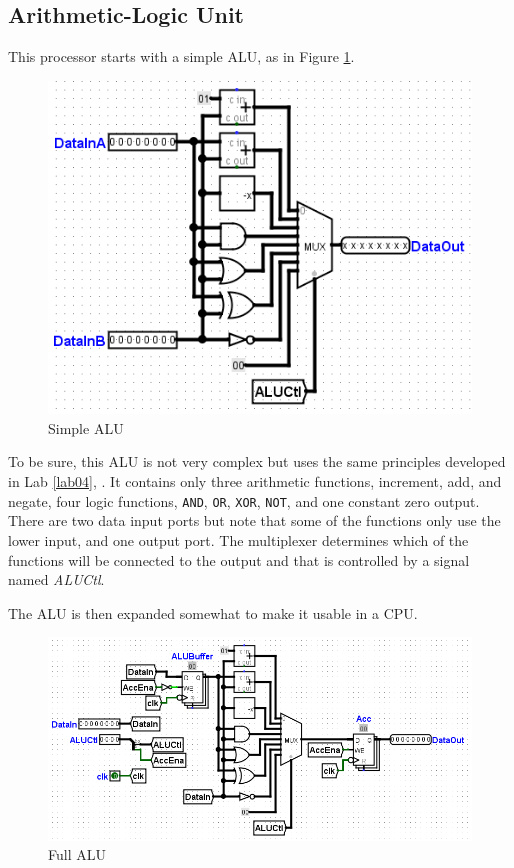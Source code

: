 \subsection{Arithmetic-Logic Unit}

This processor starts with a simple \ac{ALU}, as in Figure \ref{fig:11-01}.

\begin{figure}[H]
	\centering
	\includegraphics[width=\maxwidth{.95\linewidth}]{gfx/11-01}
	\caption{Simple ALU}
	\label{fig:11-01}
\end{figure}

To be sure, this \ac{ALU} is not very complex but uses the same principles developed in Lab \ref{lab04}, . It contains only three arithmetic functions, increment, add, and negate, four logic functions, \texttt{AND}, \texttt{OR}, \texttt{XOR}, \texttt{NOT}, and one constant zero output. There are two data input ports but note that some of the functions only use the lower input, and one output port. The multiplexer determines which of the functions will be connected to the output and that is controlled by a signal named \textit{ALUCtl}.

The \ac{ALU} is then expanded somewhat to make it usable in a \ac{CPU}.

\begin{figure}[H]
	\centering
	\includegraphics[width=\maxwidth{.95\linewidth}]{gfx/11-02}
	\caption{Full ALU}
	\label{fig:11-02}
\end{figure}

